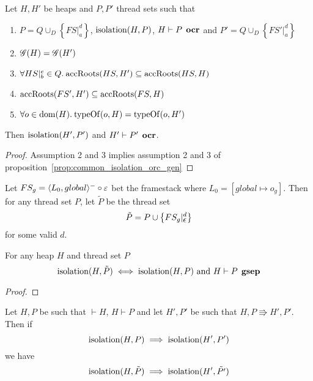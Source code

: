 \begin{corollary} \label{prop:common_isolation_orc}
  Let $H, H'$ be heaps and $P, P'$ thread sets such that
  \begin{enumerate}
    \item $P = Q \cup_D \left\{ FS|_a^d \right\}$, $\mbox{$\mathrm{isolation}$}{(H, P)}$, $H
      \vdash P \:\: \mbox{\bf ocr}$ and $P' = Q \cup_D \left\{ FS'|_a^d \right\}$
    \item $\mathscr{G}{(H)} = \mathscr{G}{(H')}$
    \item $\forall HS|_b^e \in Q. \: \mbox{$\mathrm{accRoots}$}{(HS, H')} \subseteq \mbox{$\mathrm{accRoots}$}{(HS, H)}$
    \item $\mbox{$\mathrm{accRoots}$}{(FS', H')} \subseteq \mbox{$\mathrm{accRoots}$}{(FS, H)}$
    \item $\forall o \in \mbox{$\mathrm{dom}$}{(H)}. \: \mbox{$\mathrm{typeOf}$}{(o, H)} = \mbox{$\mathrm{typeOf}$}{(o, H')}$
  \end{enumerate}
  Then $\mbox{$\mathrm{isolation}$}{(H', P')}$ and $H' \vdash P' \:\: \mbox{\bf ocr}$.
\end{corollary}

\begin{proof}
  Assumption 2 and 3 implies assumption 2 and 3 of
  proposition~\ref{prop:common_isolation_orc_gen}
\end{proof}

\begin{definition} \label{def:ptilde}
  Let $FS_g = \mbox{$\langle L_0, global \rangle^{-}$} \circ \varepsilon$ bet the framestack where
  $L_0 = [global \mapsto o_g]$. Then for any thread set $P$, let $\tilde{P}$ be the
  thread set
  \begin{equation*}
    \tilde{P} = P \cup \left\{ FS_g|_{\mbox{$\epsilon$}}^d \right\}
  \end{equation*}
  for some valid $d$.
\end{definition}

\begin{proposition} \label{prop:gsep_eq}
  For any heap $H$ and thread set $P$
  \begin{equation*}
    \mbox{$\mathrm{isolation}$}{(H, \tilde{P})} \iff \mbox{$\mathrm{isolation}$}{(H, P)} \text{ and } H \vdash P
    \:\: \mbox{\bf gsep} 
  \end{equation*}
\end{proposition}

\begin{proof}
  
\end{proof}

\begin{proposition} \label{prop:common_gsep}
  Let $H, P$ be such that $\vdash H$, $H \vdash P$ %
  and let $H', P'$ be such that $H, P \Rrightarrow H', P'$. Then if
  \begin{equation*}
    \mbox{$\mathrm{isolation}$}{(H,P)} \implies \mbox{$\mathrm{isolation}$}{(H', P')}
  \end{equation*}
  we have
  \begin{equation*}
    \mbox{$\mathrm{isolation}$}{(H, \tilde{P})} \implies \mbox{$\mathrm{isolation}$}{(H', \tilde{P'})}
  \end{equation*}
\end{proposition}

